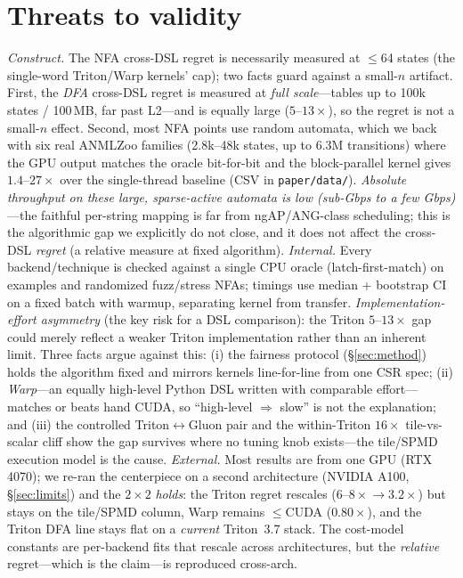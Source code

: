 \documentclass[conference]{IEEEtran}
\begin{document}
\section{Threats to validity}
\emph{Construct.} The NFA cross-DSL regret is necessarily measured at $\le$64 states (the
single-word Triton/Warp kernels' cap); two facts guard against a small-$n$ artifact. First, the
\emph{DFA} cross-DSL regret is measured at \emph{full scale}---tables up to 100k states / 100\,MB,
far past L2---and is equally large ($5$--$13\times$), so the regret is not a small-$n$ effect.
Second, most NFA points use random automata, which we back with six real ANMLZoo families
(2.8k--48k states, up to 6.3M transitions) where the GPU output matches the oracle bit-for-bit
and the block-parallel kernel gives $1.4$--$27\times$ over the single-thread baseline
(CSV in \texttt{paper/data/}).
\emph{Absolute throughput on these large, sparse-active automata is low (sub-Gbps to a few
Gbps)}---the faithful per-string mapping is far from ngAP/ANG-class scheduling; this is the
algorithmic gap we explicitly do not close, and it does not affect the cross-DSL \emph{regret}
(a relative measure at fixed algorithm). \emph{Internal.} Every backend/technique is checked against a
single CPU oracle (latch-first-match) on examples and randomized fuzz/stress NFAs; timings
use median + bootstrap CI on a fixed batch with warmup, separating kernel from transfer.
\emph{Implementation-effort asymmetry} (the key risk for a DSL comparison): the Triton
$5$--$13\times$ gap could merely reflect a weaker Triton implementation rather than an inherent
limit. Three facts argue against this: (i) the fairness protocol (\S\ref{sec:method}) holds the
algorithm fixed and mirrors kernels line-for-line from one CSR spec; (ii) \emph{Warp}---an
equally high-level Python DSL written with comparable effort---matches or beats hand CUDA, so
``high-level $\Rightarrow$ slow'' is not the explanation; and (iii) the controlled
Triton$\leftrightarrow$Gluon pair and the within-Triton $16\times$ tile-vs-scalar cliff show the
gap survives where no tuning knob exists---the tile/SPMD execution model is the cause. \emph{External.} Most results are from one GPU (RTX 4070); we re-ran the centerpiece on a second
architecture (NVIDIA A100, \S\ref{sec:limits}) and the $2\times2$ \emph{holds}: the Triton regret
rescales ($6$--$8\times\!\rightarrow\!3.2\times$) but stays on the tile/SPMD column, Warp remains
$\le$CUDA ($0.80\times$), and the Triton DFA line stays flat on a \emph{current} Triton~3.7 stack.
The cost-model constants are per-backend fits that rescale across architectures, but the
\emph{relative} regret---which is the claim---is reproduced cross-arch.
\end{document}
